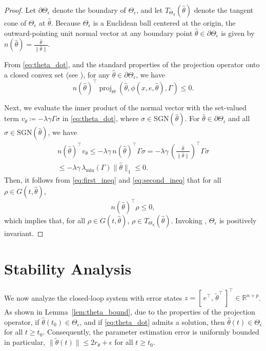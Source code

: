 \documentclass[conference]{ieeeconf}
\newcommand{\proj}{\operatorname{proj}}
\begin{document}
\begin{proof}
Let $\partial \Theta_{\epsilon}$ denote the boundary of $\Theta_{\epsilon}$, and let ${T_\Theta}_{\epsilon}(\hat{\theta})$ denote the tangent cone of $\Theta_{\epsilon}$ at $\hat{\theta}$. Because $\Theta_{\epsilon}$ is a Euclidean ball centered at the origin, the outward-pointing unit normal vector at any boundary point $\hat{\theta} \in \partial \Theta_{\epsilon}$ is given by $n(\hat{\theta}) = \frac{\hat{\theta}}{\|\hat{\theta}\|}$.

From \eqref{eq:theta_dot}, and the standard properties of the projection operator onto a closed convex set (see \cite[Lemma E.1]{SCC.Krstic.Kanellakopoulos.ea1995}), for any $\hat{\theta} \in \partial \Theta_{\epsilon}$, we have
\begin{equation}\label{eq:first_ineq}
n(\hat{\theta})^\top \proj_\Theta\left(\hat{\theta}, \phi(x, e, \hat{\theta}), \Gamma\right) \le 0.
\end{equation}

Next, we evaluate the inner product of the normal vector with the set-valued term $v_{\theta} \coloneqq -\lambda \gamma \Gamma \sigma$ in \eqref{eq:theta_dot}, where $\sigma \in \mathrm{SGN}(\hat{\theta})$. For $\hat{\theta} \in \partial \Theta_{\epsilon}$ and all $\sigma \in \mathrm{SGN}(\hat{\theta})$, we have
\begin{multline}\label{eq:second_ineq}
n(\hat{\theta})^\top v_{\theta}
\le -\lambda \gamma\, n(\hat{\theta})^\top \Gamma \sigma
= -\lambda \gamma\, \left( \frac{\hat{\theta}}{\|\hat{\theta}\|} \right)^\top \Gamma \sigma
\\\le -\lambda \gamma\, \lambda_{\min}(\Gamma) \|\hat{\theta}\|_1 \le 0.
\end{multline}
Then, it follows from \eqref{eq:first_ineq} and \eqref{eq:second_ineq} that for all $\rho \in G(t, \hat{\theta})$,
\begin{equation}
n(\hat{\theta})^\top \rho \le 0,
\end{equation}
which implies that, for all $\rho \in G(t, \hat{\theta})$,  $\rho \in {T_\Theta}_{\epsilon}(\hat{\theta})$. Invoking \cite[Theorem.~7]{aubin.cellina.1984}, $\Theta_\epsilon$ is positively invariant. 
\end{proof}

\section{Stability Analysis}
\label{subsec:lyap}

We now analyze the closed-loop system with error states $z = [\,e^\top,\,\tilde{\theta}^\top\,]^\top \in \mathbb{R}^{n+p}$. As shown in Lemma~\ref{lem:theta_bound}, due to the properties of the projection operator, if $\hat{\theta}(t_0) \in \Theta_{\epsilon}$,  and if \eqref{eq:theta_dot} admits a solution, then $\hat{\theta}(t) \in \Theta_{\epsilon}$ for all $t \ge t_0$. Consequently, the parameter estimation error is uniformly bounded in particular, $\|\tilde{\theta}(t)\| \le 2r_{\theta} + \epsilon$ for all $t \ge t_0$.
\end{document}
